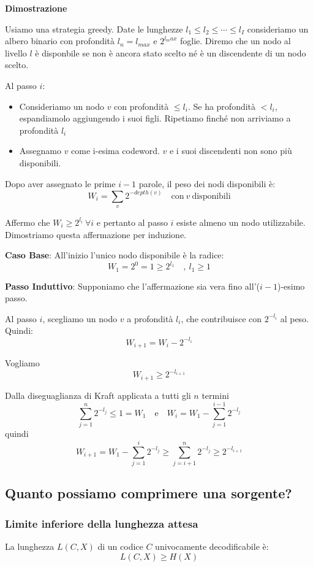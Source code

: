 \textbf{Dimostrazione}

Usiamo una strategia greedy. Date le lunghezze $l_1 \leq l_2 \leq \cdots \leq l_I$ consideriamo un albero binario con profondità $l_n = l_{max}$ e $2^{l_max}$ foglie. Diremo che un nodo al livello $l$ è disponbile se non è ancora stato scelto né è un discendente di un nodo scelto.

Al passo $i$:
\begin{itemize}
	\item Consideriamo un nodo $v$ con profondità $\leq l_i$. Se ha profondità $< l_i$, espandiamolo aggiungendo i suoi figli. Ripetiamo finché non arriviamo a profondità $l_i$
	\item Assegnamo $v$ come i-esima codeword. $v$ e i suoi discendenti non sono più disponibili.
\end{itemize}

Dopo aver assegnato le prime $i-1$ parole, il peso dei nodi disponibili è:
$$
W_i = \sum_{v} 2^{-depth(v)}\quad\text{con}\ v\ \text{disponibili}  
$$

\newpage

Affermo che $W_i \geq 2^{l_i}\ \forall i$ e pertanto al passo $i$ esiste almeno un nodo utilizzabile. Dimostriamo questa affermazione per induzione.

\textbf{Caso Base}: All'inizio l'unico nodo disponibile è la radice:
$$
W_1 = 2^0 = 1 \geq 2^{l_1}\quad,\ l_1 \geq 1
$$

\textbf{Passo Induttivo}: Supponiamo che l'affermazione sia vera fino all'($i-1$)-esimo passo.

Al passo $i$, scegliamo un nodo $v$ a profondità $l_i$, che contribuisce con $2^{-l_i}$ al peso. Quindi:
$$
W_{i+1} = W_i - 2^{-l_i}
$$

Vogliamo $$W_{i+1} \geq 2^{-l_{i+1}}$$

Dalla diseguaglianza di Kraft applicata a tutti gli $n$ termini
$$
\sum_{j=1}^{n} 2^{-l_j} \leq 1 = W_1	\quad \text{e} \quad W_i = W_1 - \sum_{j=1}^{i-1} 2^{-l_j}
$$
quindi
$$
W_{i+1} = W_1 - \sum_{j=1}^{i} 2^{-l_j} \geq \sum_{j=i+1}^{n} 2^{-l_j} \geq 2^{-l_{i+1}}
$$

\subsection{Quanto possiamo comprimere una sorgente?}
\subsubsection{Limite inferiore	della lunghezza attesa}
La lunghezza $L(C,X)$ di un codice $C$ univocamente decodificabile è: 
\begin{equation}
	L(C,X) \geq H(X)
\end{equation}

